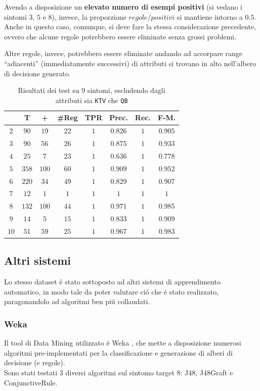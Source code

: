 \documentclass[preprint]{acm_proc_article-sp}
\begin{document}
Avendo a disposizione un \textbf{elevato numero di esempi positivi} (si vedano i sintomi $3$, $5$ e $8$), invece, la proporzione $regole/positivi$ si mantiene intorno a $0.5$. Anche in questo caso, comunque, si deve fare la stessa considerazione precedente, ovvero che alcune regole potrebbero essere eliminate senza grossi problemi.

Altre regole, invece, potrebbero essere eliminate andando ad accorpare range ``adiacenti'' (immediatamente successivi) di attributi si trovano in alto nell'albero di decisione generato.

\begin{table}[h]
\centering
\begin{tabular}{|c|c|c|c|c|c|c|c|} \hline
& \textbf{T} &\textbf{+} &\textbf{\#Reg} &\textbf{TPR} &\textbf{Prec.} &\textbf{Rec.} &\textbf{F-M.}  \\ \hline \hline
$2$	&$90$	&$19$	&$22$	&$1$	&$0.826$	&$1$	&$0.905$	\\ \hline
$3$ &$90$	&$56$	&$26$	&$1$	&$0.875$	&$1$	&$0.933$	\\ \hline
$4$ &$25$	&$7$	&$23$	&$1$	&$0.636$	&$1$	&$0.778$	\\ \hline
$5$ &$358$	&$100$	&$60$	&$1$	&$0.909$	&$1$	&$0.952$	\\ \hline
$6$ &$220$	&$34$	&$49$	&$1$	&$0.829$	&$1$	&$0.907$	\\ \hline
$7$ &$12$	&$1$	&$1$	&$1$	&$1$		&$1$	&$1$		\\ \hline
$8$ &$132$	&$100$	&$44$	&$1$	&$0.971$	&$1$	&$0.985$	\\ \hline
$9$	&$14$	&$5$	&$15$	&$1$	&$0.833$	&$1$	&$0.909$	\\ \hline
$10$&$51$	&$59$	&$25$	&$1$	&$0.967$	&$1$	&$0.983$	\\
\hline\end{tabular}
\caption{Risultati dei test su $9$ sintomi, escludendo dagli attributi sia \texttt{KTV} che \texttt{QB}}
\label{table:risultati-test}
\end{table}

\subsection{Altri sistemi}
Lo stesso dataset \'e stato sottoposto ad altri sistemi di apprendimento automatico, in modo tale da poter valutare ci\'o che \'e stato realizzato, paragonandolo ad algoritmi ben pi\'u collaudati.

\subsubsection{Weka}
\label{altri-weka}
Il tool di Data Mining utilizzato \'e Weka \cite{Weka:2014:Online}, che mette a disposizione numerosi algoritmi pre-implementati per la classificazione e generazione di alberi di decisione (e regole).\\
Sono stati testati $3$ diversi algoritmi sul sintomo target $8$: J48, J48Graft e ConjunctiveRule.
\end{document}
